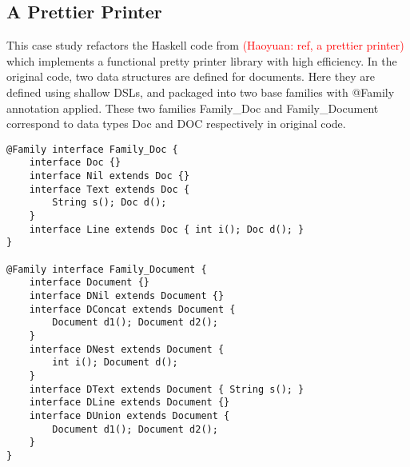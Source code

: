 \subsection{A Prettier Printer}

This case study refactors the Haskell code from \textcolor{red}{(Haoyuan: ref, a prettier printer)}
which implements a functional pretty printer library with high efficiency. In the original code, two
data structures are defined for documents. Here they are defined using shallow DSLs, and packaged into
two base families with \textsf{@Family} annotation applied. These two families \textsf{Family\_Doc} and
\textsf{Family\_Document} correspond to data types \textsf{Doc} and \textsf{DOC} respectively in original code.

\begin{lstlisting}
@Family interface Family_Doc {
	interface Doc {}
	interface Nil extends Doc {}
	interface Text extends Doc {
		String s(); Doc d();
	}
	interface Line extends Doc { int i(); Doc d(); }
}

@Family interface Family_Document {
	interface Document {}
	interface DNil extends Document {}
	interface DConcat extends Document {
		Document d1(); Document d2();
	}
	interface DNest extends Document {
		int i(); Document d();
	}
	interface DText extends Document { String s(); }
	interface DLine extends Document {}
	interface DUnion extends Document {
		Document d1(); Document d2();
	}
}
\end{lstlisting}

